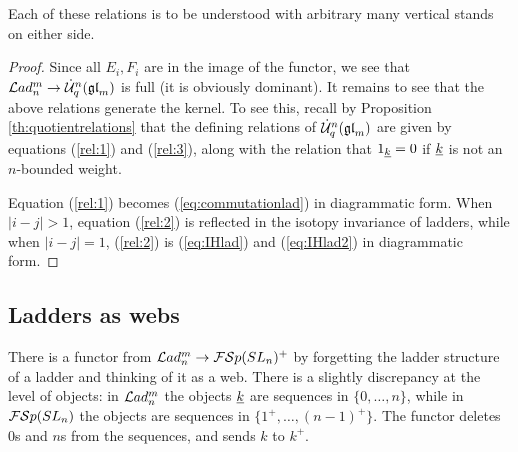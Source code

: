 \documentclass[11pt,leqno]{article}
\begin{document}
Each of these relations is to be understood with arbitrary many vertical stands on either side.

\begin{proof}
Since all $ E_i, F_i $ are in the image of the functor, we see that $ \mathcal{L}ad_n^m \rightarrow \dot{{\mathcal{U}}}_q^n({\mathfrak{gl}}_m) $ is full (it is obviously dominant).  It remains to see that the above relations generate the kernel.  To see this, recall by Proposition \ref{th:quotientrelations} that the defining relations of $ \dot{{\mathcal{U}}}_q^n({\mathfrak{gl}}_m) $ are given by equations (\ref{rel:1}) and (\ref{rel:3}), along with the relation that $ 1_{{\underline{k}}} = 0 $ if $ {\underline{k}} $ is not an $ n$-bounded weight.
 
Equation (\ref{rel:1}) becomes (\ref{eq:commutationlad}) in diagrammatic form.  When $ |i-j| > 1 $, equation (\ref{rel:2}) is reflected in the isotopy invariance of ladders, while when $ |i-j |= 1$, (\ref{rel:2}) is (\ref{eq:IHlad}) and (\ref{eq:IHlad2}) in diagrammatic form. 
\end{proof}

\subsection{Ladders as webs}\label{sec:psi}
There is a functor from $ \mathcal{L}ad_n^m \rightarrow {\mathcal{FS}p}(SL_n)^+$  by forgetting the ladder structure of a ladder and thinking of it as a web. There is a slightly discrepancy at the level of objects: in $\mathcal{L}ad_n^m$ the objects ${\underline{k}}$ are sequences in $\{0,\ldots,n\}$, while in ${\mathcal{FS}p}(SL_n)$ the objects are sequences in $\{1^+,\ldots,(n-1)^+\}$. The functor deletes $0$s and $n$s from the sequences, and sends $k$ to $k^+$.
\end{document}
